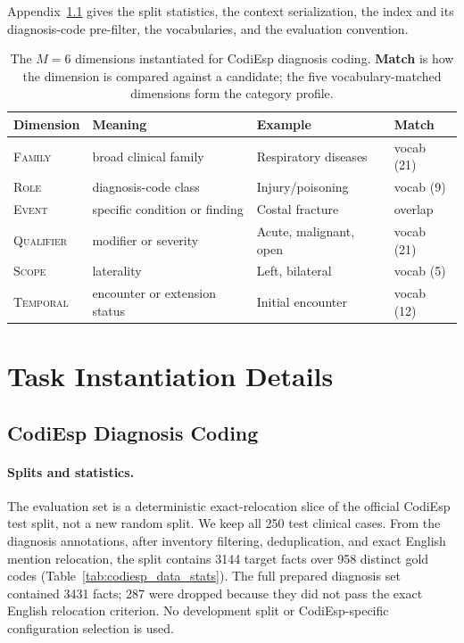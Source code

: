 Appendix~\ref{app:codiesp} gives the split statistics, the context
serialization, the index and its diagnosis-code pre-filter, the vocabularies,
and the evaluation convention.

\begin{table}[!htbp]
\centering
\scriptsize
\begin{tabular}{@{}llll@{}}
\toprule
\textbf{Dimension} & \textbf{Meaning} & \textbf{Example} & \textbf{Match} \\
\midrule
\textsc{Family} & broad clinical family & Respiratory diseases & vocab (21) \\
\textsc{Role} & diagnosis-code class & Injury/poisoning & vocab (9) \\
\textsc{Event} & specific condition or finding & Costal fracture & overlap \\
\textsc{Qualifier} & modifier or severity & Acute, malignant, open & vocab (21) \\
\textsc{Scope} & laterality & Left, bilateral & vocab (5) \\
\textsc{Temporal} & encounter or extension status & Initial encounter & vocab (12) \\
\bottomrule
\end{tabular}
\caption{The $M{=}6$ dimensions instantiated for CodiEsp diagnosis coding.
\textbf{Match} is how the dimension is compared against a candidate; the five
vocabulary-matched dimensions form the category profile.}
\label{tab:codiesp_schema}
\end{table}



\section{Task Instantiation Details}
\label{app:instantiation}

\subsection{CodiEsp Diagnosis Coding}
\label{app:codiesp}

\paragraph{Splits and statistics.}
The evaluation set is a deterministic exact-relocation slice of the official
CodiEsp test split, not a new random split. We keep all 250 test clinical
cases. From the diagnosis annotations, after inventory filtering,
deduplication, and exact English mention relocation, the split contains
\num{3144} target facts over \num{958} distinct gold codes
(Table~\ref{tab:codiesp_data_stats}). The full prepared diagnosis set contained
\num{3431} facts; \num{287} were dropped because they did not pass the exact
English relocation criterion. No development split or CodiEsp-specific
configuration selection is used.

